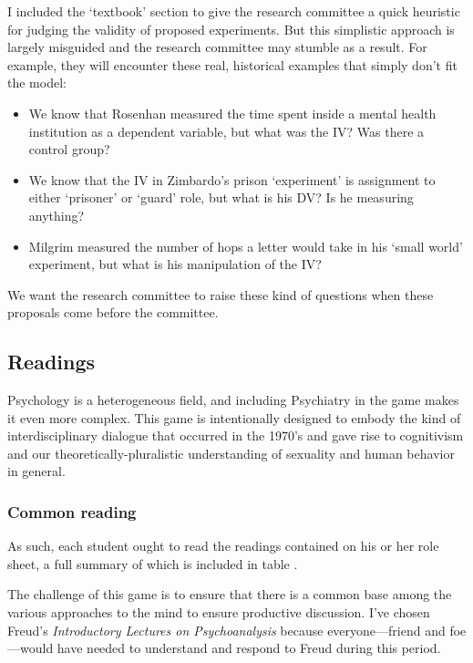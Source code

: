 \begin{refsection}
I included the ‘textbook’ section to give the research committee a quick heuristic for judging the validity of proposed experiments. But this simplistic approach is largely misguided and the research committee may stumble as a result. For example, they will encounter these real, historical examples that simply don’t fit the model:

\begin{itemize}
\item We know that Rosenhan measured the time spent inside a mental health institution as a dependent variable, but what was the IV? Was there a control group?

\item We know that the IV in Zimbardo’s prison ‘experiment’ is assignment to either ‘prisoner’ or ‘guard’ role, but what is his DV? Is he measuring anything?

\item Milgrim measured the number of hops a letter would take in his ‘small world’ experiment, but what is his manipulation of the IV?

\end{itemize}

We want the research committee to raise these kind of questions when these proposals come before the committee. 

\subsection{Readings}
\label{readings}

Psychology is a heterogeneous field, and including Psychiatry in the game makes it even more complex. This game is intentionally designed to embody the kind of interdisciplinary dialogue that occurred in the 1970’s and gave rise to cognitivism and our theoretically-pluralistic understanding of sexuality and human behavior in general. 

\subsubsection{Common reading}
\label{commonreading}

As such, each student ought to read the readings contained on his or her role sheet, a full summary of which is included in table .

The challenge of this game is to ensure that there is a common base among the various approaches to the mind to ensure productive discussion. I’ve chosen Freud’s \emph{Introductory Lectures on Psychoanalysis} because everyone---friend and foe---would have needed to understand and respond to Freud during this period. 


\end{refsection}
